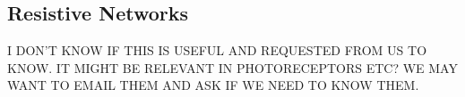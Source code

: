\subsection{Resistive Networks}

I DON'T KNOW IF THIS IS USEFUL AND REQUESTED FROM US TO KNOW. IT MIGHT BE RELEVANT IN PHOTORECEPTORS ETC? WE MAY WANT TO EMAIL THEM AND ASK IF WE NEED TO KNOW THEM.